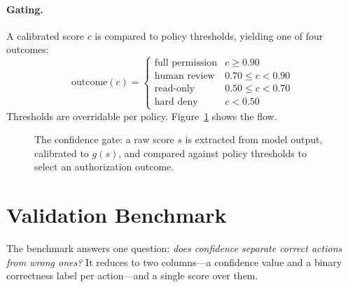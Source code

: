 \documentclass[10pt,twocolumn]{article}
\begin{document}
\paragraph{Gating.}
A calibrated score $c$ is compared to policy thresholds, yielding one of four
outcomes:
\[
\text{outcome}(c)=
\begin{cases}
\text{full permission} & c \ge 0.90\\
\text{human review} & 0.70 \le c < 0.90\\
\text{read-only} & 0.50 \le c < 0.70\\
\text{hard deny} & c < 0.50
\end{cases}
\]
Thresholds are overridable per policy. Figure~\ref{fig:pipeline} shows the flow.

\begin{figure}[t]
\centering
{}
\caption{The confidence gate: a raw score $s$ is extracted from model output,
calibrated to $g(s)$, and compared against policy thresholds to select an
authorization outcome.}
\label{fig:pipeline}
\end{figure}

\section{Validation Benchmark}
\label{sec:method}
The benchmark answers one question: \emph{does confidence separate correct actions
from wrong ones?} It reduces to two columns---a confidence value and a binary
correctness label per action---and a single score over them.
\end{document}
